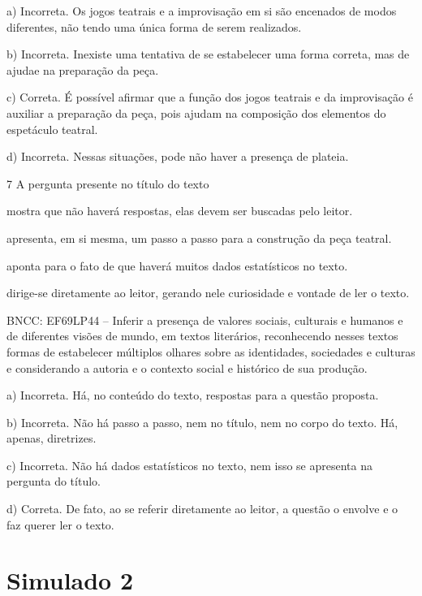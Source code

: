 \begin{escolha}
\begin{escolha}
\begin{escolha}
\begin{escolha}
\begin{escolha}
a) Incorreta. Os jogos teatrais e a improvisação em si são encenados de
modos diferentes, não tendo uma única forma de serem realizados.

b) Incorreta. Inexiste uma tentativa de se estabelecer uma forma
correta, mas de ajudae na preparação da peça.

c) Correta. É possível afirmar que a função dos jogos teatrais e da
improvisação é auxiliar a preparação da peça, pois ajudam na composição
dos elementos do espetáculo teatral.

d) Incorreta. Nessas situações, pode não haver a presença de plateia.

\num{7} A pergunta presente no título do texto

\begin{escolha}
\item mostra que não haverá respostas, elas devem ser buscadas pelo
leitor.

\item apresenta, em si mesma, um passo a passo para a construção da peça
teatral.

\item aponta para o fato de que haverá muitos dados estatísticos no texto.

\item dirige-se diretamente ao leitor, gerando nele curiosidade e vontade
de ler o texto.
\end{escolha}

BNCC: EF69LP44 -- Inferir a presença de valores sociais, culturais e
humanos e de diferentes visões de mundo, em textos literários,
reconhecendo nesses textos formas de estabelecer múltiplos olhares sobre
as identidades, sociedades e culturas e considerando a autoria e o
contexto social e histórico de sua produção.

a) Incorreta. Há, no conteúdo do texto, respostas para a questão
proposta.

b) Incorreta. Não há passo a passo, nem no título, nem no corpo do
texto. Há, apenas, diretrizes.

c) Incorreta. Não há dados estatísticos no texto, nem isso se apresenta
na pergunta do título.

d) Correta. De fato, ao se referir diretamente ao leitor, a questão o
envolve e o faz querer ler o texto.

\chapter{Simulado 2}


\end{escolha}
\end{escolha}
\end{escolha}
\end{escolha}
\end{escolha}
